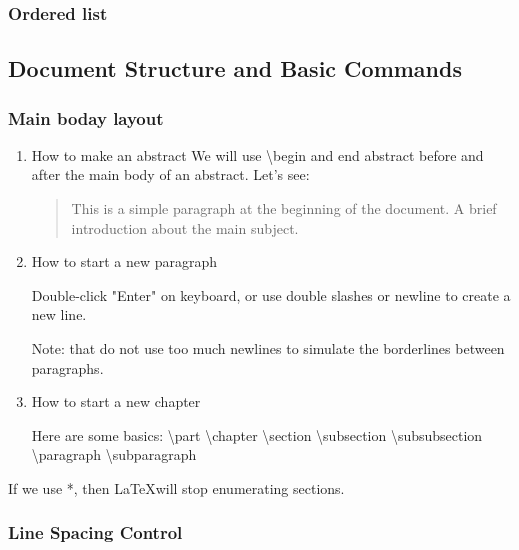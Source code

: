 \documentclass[12pt, letterpaper]{article}
\begin{document}
\begin{spacing}{1.3}
\subsubsection{Ordered list}


\subsection{Document Structure and Basic Commands}
\subsubsection{Main boday layout}
\begin{enumerate}
    \item How to make an abstract
We will use \textbackslash begin and end abstract before and after the main body of an abstract. Let's see:
\begin{abstract}
This is a simple paragraph at the beginning of the
document. A brief introduction about the main subject.
\end{abstract}

    \item How to start a new paragraph

Double-click "Enter" on keyboard, or use double slashes or newline to create a new line.

Note: that do not use too much newlines to simulate the borderlines between paragraphs.
    \item How to start a new chapter

Here are some basics: \textbackslash part \textbackslash chapter \textbackslash section \textbackslash subsection \textbackslash subsubsection \textbackslash paragraph \textbackslash subparagraph
\end{enumerate}

If we use *, then \LaTeX will stop enumerating sections.

\subsubsection{Line Spacing Control}


\end{spacing}
\end{document}
